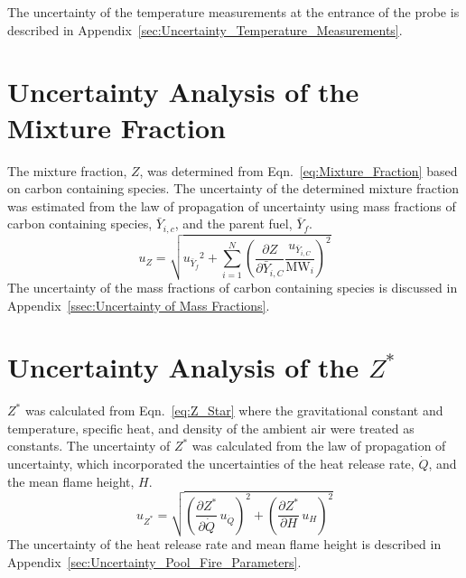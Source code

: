\documentclass[12pt]{article}
\begin{document}
The uncertainty of the temperature measurements at the entrance of the probe is described in Appendix~\ref{sec:Uncertainty_Temperature_Measurements}.

\pagebreak

\section{Uncertainty Analysis of the Mixture Fraction}\label{sec:Uncertainty_Mix_Frac}
The mixture fraction, $Z$, was determined from Eqn.~\ref{eq:Mixture_Fraction} based on carbon containing species. The uncertainty of the determined mixture fraction was estimated from the law of propagation of uncertainty using mass fractions of carbon containing species, $\bar{Y}_{i,c}$, and the parent fuel, $\bar{Y}_{f}$.
\begin{equation}
\label{eq:mixture_frac_uncertainty}
u_{\scriptscriptstyle Z}=\sqrt{{u_{\scriptscriptstyle \bar{Y}_{f}}}^2+{\sum_{i=1}^{N}{\left(\frac{\partial Z}{\partial \bar{Y}_{i,C}}\frac{u_{\scriptscriptstyle \bar{Y}_{i,C}}}{\textrm{MW}_{i}} \right)}^2}}
\end{equation}
The uncertainty of the mass fractions of carbon containing species is discussed in Appendix~\ref{ssec:Uncertainty of Mass Fractions}.

\pagebreak

\section{Uncertainty Analysis of the $Z^{*}$}\label{sec:Uncertainty_Z_star}
$Z^{*}$ was calculated from Eqn.~\ref{eq:Z_Star} where the gravitational constant and temperature, specific heat, and density of the ambient air were treated as constants. The uncertainty of $Z^{*}$ was calculated from the law of propagation of uncertainty, which incorporated the uncertainties of the heat release rate, $\dot{Q}$, and the mean flame height, $H$.
\begin{equation}
\label{eq:heat_release_rate_uncertainty}
u_{\scriptscriptstyle Z^{*}} = \sqrt{{\left(\frac{\partial Z^{*}}{\partial \dot{Q}}\,u_{\scriptscriptstyle \dot{Q}} \right)}^2+{\left(\frac{\partial Z^{*}}{\partial H}\,u_{\scriptscriptstyle H} \right)}^2}
\end{equation}
The uncertainty of the heat release rate and mean flame height is described in Appendix~\ref{sec:Uncertainty_Pool_Fire_Parameters}.
\end{document}
